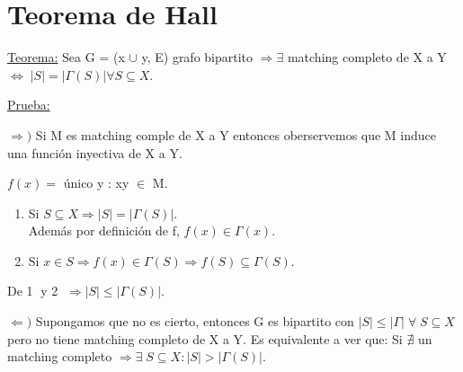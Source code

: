 \documentclass[12pt,a4paper]{report}
\begin{document}
	
	
	
	
	
	
	
	
	
	
	
	
	
	
	
	
	
	
	
	
	
	
	
	
	
	
	\section{Teorema de Hall}
	
		\underline{Teorema:} Sea G = (x $\cup$ y, E) grafo bipartito $\Rightarrow \exists$ matching completo de X a Y $\Leftrightarrow \; \lvert S \rvert = \lvert \Gamma(S) \rvert \forall S \subseteq X$.
		
		\underline{Prueba:}

			$\Rightarrow)$ Si M es matching comple de X a Y entonces oberservemos que M induce una función inyectiva de X a Y.
			
			\begin{center}
				$f(x) = $ único y : xy $\in$ M.
			\end{center}
			
			\begin{enumerate}
				\item Si $S \subseteq X \Rightarrow \lvert S \rvert = \lvert \Gamma(S) \rvert$. \\
				
				Además por definición de f, $f(x) \in \Gamma(x)$.
				\item Si $x \in S \Rightarrow f(x) \in \Gamma(S)
				\Rightarrow f(S) \subseteq \Gamma(S)$.
			\end{enumerate}
			
			De \textcircled{1} y \textcircled{2} $\Rightarrow \lvert S \rvert \leq \lvert \Gamma(S) \rvert$.
			
			\vspace{5mm}
			$\Leftarrow)$ Supongamos que no es cierto, entonces G es bipartito con $\lvert S \rvert \leq \lvert \Gamma \rvert \; \forall \; S \subseteq X$ pero no tiene matching completo de X a Y. Es equivalente a ver que: Si $\nexists$ un matching completo $\Rightarrow \exists \; S \subseteq X : \lvert S \rvert > \lvert \Gamma(S) \rvert$.
			
\end{document}
